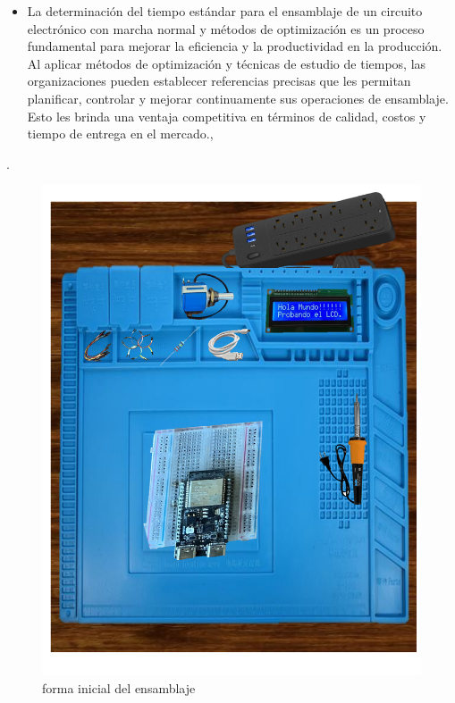     \begin{itemize}
    \item La determinación del tiempo estándar para el ensamblaje de un circuito electrónico con marcha normal y métodos de optimización es un proceso fundamental para mejorar la eficiencia y la productividad en la producción. Al aplicar métodos de optimización y técnicas de estudio de tiempos, las organizaciones pueden establecer referencias precisas que les permitan planificar, controlar y mejorar continuamente sus operaciones de ensamblaje. Esto les brinda una ventaja competitiva en términos de calidad, costos y tiempo de entrega en el mercado.\cite{Groover},\cite{Niebel}
    \end{itemize}.
      \begin{figure}[H] 
            \centering
            \includegraphics[trim = {12mm 20mm 10mm 14mm},clip,scale=0.15]{1/img/Colocacion de Piezas.pdf}
            \caption{forma inicial del ensamblaje}
            \label{fig:Colocacion de Piezas}
        \end{figure}
